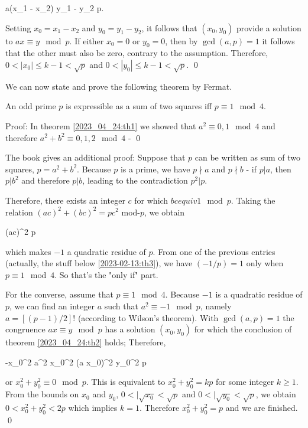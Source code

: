 \bee
a(x_1 - x_2) \equiv y_1 - y_2 \mod p.
\eee

Setting $x_0 = x_1 - x_2$ and $y_0 = y_1 - y_2$, it follows that $(x_0, y_0)$ provide a solution to $ax \equiv y \mod p$. If either $x_0 = 0$ or $y_0 = 0$, then by $\gcd(a,p) = 1$ it follows that the other must also be zero, contrary to the assumption. Therefore, $0 < |x_0| \leq k-1 < \sqrt{p}$ and $0 < |y_0| \leq k-1 < \sqrt{p}$. \qed


We can now state and prove the following theorem by Fermat.

\begin{theorem}
An odd prime $p$ is expressible as a sum of two squares iff $p \equiv 1 \mod 4$.
\end{theorem}

Proof: In theorem \eqref{2023_04_24:th1} we showed that $a^2 \equiv 0, 1 \mod 4$ and therefore $a^2 + b^2 \equiv 0, 1, 2 \mod 4$ - \qed

The book gives an additional proof: Suppose that $p$ can be written as sum of two squares, $p = a^2 + b^2$. Because $p$ is a prime, we have $p \nmid a$ and $p \nmid b$ - if $p | a$, then $p | b^2$ and therefore $p|b$, leading to the contradiction $p^2 | p$.

Therefore, there exists an integer $c$ for which $bc equiv 1 \mod p$. Taking the relation $(ac)^2 +(bc)^2 = pc^2$ mod-$p$, we obtain

\bee
(ac)^2  \mod p
\eee

which makes $-1$ a quadratic residue of $p$. From one of the previous entries (actually, the stuff below \ref{2023-02-13:th3}), we have $(-1/p) = 1$ only when $p \equiv 1 \mod 4$. So that's the "only if" part.

For the converse, assume that $p \equiv 1 \mod 4$. Because $-1$ is a quadratic residue of $p$, we can find an integer $a$ such that $a^2 \equiv -1 \mod p$, namely $a = [(p-1)/2]!$ (according to Wilson's theorem). With $\gcd(a,p) = 1$ the congruence $ax \equiv y \mod p$ has a solution $(x_0, y_0)$ for which the conclusion of theorem \ref{2023_04_24:th2} holds; Therefore, 

\bee
-x_0^2 \equiv a^2 x_0^2 \equiv (a x_0)^2 \equiv y_0^2 \mod p
\eee

or $x_0^2 + y_0^2 \equiv 0 \mod p$. This is equivalent to $x_0^2 + y_0^2 = kp$ for some integer $k \geq 1$. From the bounds on $x_0$ and $y_0$, $0 < | \sqrt{x_0} < \sqrt{p}$ and $0 < | \sqrt{y_0} < \sqrt{p}$, we obtain $0 < x_0^2 + y_0^2 < 2p$ which implies $k=1$. Therefore $x_0^2 + y_0^2 = p$ and we are finished. \qed

